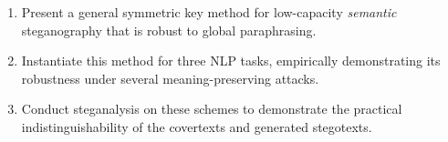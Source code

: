\begin{enumerate}[itemsep=0pt, parsep=0pt]
    \item Present a general symmetric key method for low-capacity \emph{semantic} steganography that is robust to global paraphrasing.
    \item Instantiate this method for three NLP tasks, empirically demonstrating its robustness under several meaning-preserving attacks.
    \item Conduct steganalysis on these schemes to demonstrate the practical indistinguishability of the covertexts and generated stegotexts.
\end{enumerate}


